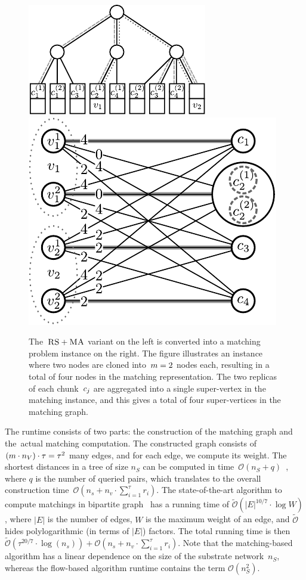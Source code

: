 \begin{figure}
  \centering
  \includegraphics[width = 0.39\columnwidth]{figs/static-mapping/model_ma_r_cv_boxes}
  \centering
  \hspace{1cm}
  \includegraphics[width =0.39\columnwidth]{figs/static-mapping/matching}
\caption{The~$\textsc{RS}+\textsc{MA}$ variant on the left is converted into a
  matching problem instance on the right.
The figure illustrates
an instance where two nodes are
cloned into~$m = 2$ nodes each,
resulting in a total of four nodes in
the matching representation.
The two replicas of each chunk~$c_j$ are
aggregated into a single super-vertex  in the matching instance, and
this gives a total of four super-vertices in the matching graph.
}
\label{fig:matching}
\end{figure}

The runtime consists of two parts: the construction of the matching graph and
the~actual matching computation. The constructed graph consists of
$(m \cdot n_V) \cdot \tau = \tau^2$
many edges,
and for each edge, we compute its weight. The shortest distances
in a tree of size $n_S$ can be computed in time~$\mathcal{O}(n_S + q)$~\cite{offline-lca}, where $q$ is the number of queried pairs, which translates to the overall construction time~$\mathcal{O}(n_s + n_v\cdot \sum_{i=1}^\tau r_i)$.
The state-of-the-art algorithm to compute matchings in bipartite graph~\cite{matching-best} has a running time of $\tilde{\mathcal{O}}(|E|^{10/7}\cdot \log W)$, where $|E|$ is the number of edges, $W$ is the maximum weight of an edge, and $\tilde{\mathcal{O}}$ hides polylogarithmic (in terms of $|E|$) factors.
The total running time is then $\tilde{\mathcal{O}}(\tau^{20/7}\cdot \log(n_s)) + \mathcal{O}(n_s + n_v\cdot \sum_{i=1}^\tau r_i)$.
Note that the matching-based algorithm has a linear dependence on the size of the substrate network~$n_S$, whereas the flow-based algorithm runtime contains the term $\mathcal{O}(n_S^2)$.


